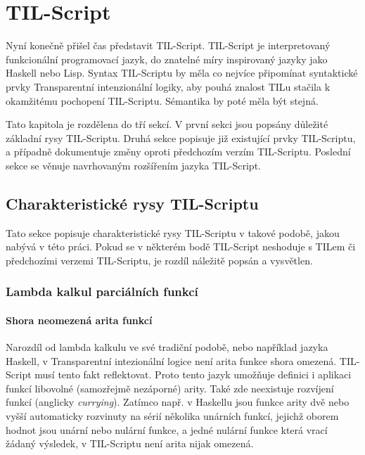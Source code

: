 \chapter{TIL-Script}

Nyní konečně přišel čas představit TIL-Script. TIL-Script je interpretovaný funkcionální programovací
jazyk, do znatelné míry inspirovaný jazyky jako Haskell nebo Lisp. Syntax TIL-Scriptu by měla co
nejvíce připomínat syntaktické prvky Transparentní intenzionální logiky, aby pouhá znalost TILu
stačila k okamžitému pochopení TIL-Scriptu. Sémantika by poté měla být stejná.

Tato kapitola je rozdělena do tří sekcí. V první sekci jsou popsány důležité základní rysy
TIL-Scriptu. Druhá sekce popisuje již existující prvky TIL-Scriptu, a případně dokumentuje změny
oproti předchozím verzím TIL-Scriptu. Poslední sekce se věnuje navrhovaným rozšířením jazyka
TIL-Script.

\section{Charakteristické rysy TIL-Scriptu}

Tato sekce popisuje charakteristické rysy TIL-Scriptu v takové podobě, jakou nabývá v této práci.
Pokud se v některém bodě TIL-Script neshoduje s TILem či předchozími verzemi TIL-Scriptu, je rozdíl
náležitě popsán a vysvětlen.

\subsection{Lambda kalkul parciálních funkcí}

\subsubsection{Shora neomezená arita funkcí}


Narozdíl od lambda kalkulu ve své tradiční podobě, nebo například jazyka Haskell, v Transparentní
intezionální logice není arita funkce shora omezená. TIL-Script musí tento fakt reflektovat. Proto
tento jazyk umožňuje definici i aplikaci funkcí libovolné (samozřejmě nezáporné) arity. Také zde
neexistuje rozvíjení funkcí (anglicky \textit{currying}). Zatímco např. v Haskellu jsou funkce
arity dvě nebo vyšší automaticky rozvinuty na sérií několika unárních funkcí, jejichž oborem hodnot
jsou unární nebo nulární funkce, a jedné nulární funkce která vrací žádaný výsledek, v TIL-Scriptu
není arita nijak omezená.

